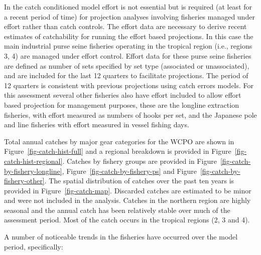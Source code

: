 \documentclass[
  english,
  a4paper,
  a4paper,
  11pt]{SCreport}
\begin{document}
In the catch conditioned model effort is not essential but is required
(at least for a recent period of time) for projection analyses involving
fisheries managed under effort rather than catch controls. The effort
data are necessary to derive recent estimates of catchability for
running the effort based projections. In this case the main industrial
purse seine fisheries operating in the tropical region (i.e., regions 3,
4) are managed under effort control. Effort data for these purse seine
fisheries are defined as number of sets specified by set type
(associated or unassociated), and are included for the last 12 quarters
to facilitate projections. The period of 12 quarters is consistent with
previous projections using catch errors models. For this assessment
several other fisheries also have effort included to allow effort based
projection for management purposes, these are the longline extraction
fisheries, with effort measured as numbers of hooks per set, and the
Japanese pole and line fisheries with effort measured in vessel fishing
days.

Total annual catches by major gear categories for the WCPO are shown in
Figure~\ref{fig-catch-hist-full} and a regional breakdown is provided in
Figure~\ref{fig-catch-hist-regional}. Catches by fishery groups are
provided in Figure~\ref{fig-catch-by-fishery-longline},
Figure~\ref{fig-catch-by-fishery-ps} and
Figure~\ref{fig-catch-by-fishery-other}. The spatial distribution of
catches over the past ten years is provided in
Figure~\ref{fig-catch-map}. Discarded catches are estimated to be minor
and were not included in the analysis. Catches in the northern region
are highly seasonal and the annual catch has been relatively stable over
much of the assessment period. Most of the catch occurs in the tropical
regions (2, 3 and 4).

A number of noticeable trends in the fisheries have occurred over the
model period, specifically:
\end{document}
